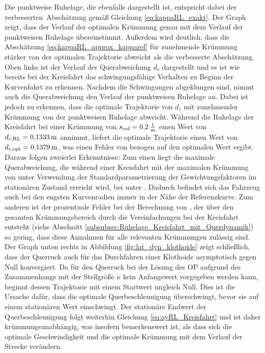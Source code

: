 Die punktweise Ruhelage, die ebenfalls dargestellt ist, entspricht dabei der \glqq verbesserten\grqq~Abschätzung gemäß Gleichung \eqref{eq:kappaRL_exakt}. Der Graph zeigt, dass der Verlauf der optimalen Krümmung genau mit dem Verlauf der punktweisen Ruhelage übereinstimmt. Außerdem wird deutlich, dass die Abschätzung \eqref{eq:kappaRL_approx_kapparef} für zunehmende Krümmung stärker von der optimalen Trajektorie abweicht als die verbesserte Abschätzung. Oben links ist der Verlauf der Querabweichung $d_r$ dargestellt und es ist wie bereits bei der Kreisfahrt das schwingungsfähige Verhalten zu Beginn der Kurvenfahrt zu erkennen. Nachdem die Schwingungen abgeklungen sind, nimmt auch die Querabweichung den Verlauf der punktweisen Ruhelage an. Dabei ist jedoch zu erkennen, dass die optimale Trajektorie von $d_r$ mit zunehmender Krümmung von der punktweisen Ruhelage abweicht. Während die Ruhelage der Kreisfahrt bei einer Krümmung von $\kappa_{\textrm{ref}} = 0{,}2\,\mathrm{\frac{\mathrm{1}}{\mathrm{m}}}$ einen Wert von $d_{r,\textrm{RL}} = 0{,}1333\,\mathrm{m}$ annimmt, liefert die optimale Trajektorie einen Wert von $d_{r,\textrm{opt}} = 0{,}1379\,\mathrm{m}$, was einen Fehler von  bezogen auf den optimalen Wert ergibt. Daraus folgen zweierlei Erkenntnisse: Zum einen liegt die maximale Querabweichung, die während einer Kreisfahrt mit der maximalen Krümmung von  unter Verwendung der Standardparametrierung der Gewichtungsfaktoren im stationären Zustand erreicht wird, bei unter . Dadurch befindet sich das Fahrzeug auch bei den engsten Kurvenradien immer in der Nähe der Referenzkurve. Zum anderen ist der prozentuale Fehler bei der Berechnung von \drRL, der über den gesamten Krümmungsbereich durch die Vereinfachungen bei der Kreisfahrt entsteht (siehe Abschnitt \ref{subsubsec:Ruhelage_Kreisfahrt_mit_Querdynamik}) so gering, dass diese Annahmen für alle relevanten Krümmungen zulässig sind. Der Graph unten rechts in Abbildung \ref{fig:lat_dyn_klothoide} zeigt schließlich, dass der Querruck auch für das Durchfahren einer Klothoide asymptotisch gegen Null konvergiert. Da für den Querruck bei der Lösung des \gls{OP} aufgrund des Zusammenhangs mit der Stellgröße $\dot{\kappa}$ kein Anfangswert vorgegeben werden kann, beginnt dessen Trajektorie mit einem Startwert ungleich Null. Dies ist die Ursache dafür, dass die optimale Querbeschleunigung überschwingt, bevor sie auf einem stationären Wert einschwingt. Der stationäre Endwert der Querbeschleunigung folgt weiterhin Gleichung \eqref{eq:ayRL_Kreisfahrt} und ist daher krümmungsunabhängig, was insofern bemerkenswert ist, als dass sich die optimale Geschwindigkeit und die optimale Krümmung mit dem Verlauf der Strecke verändern. 
